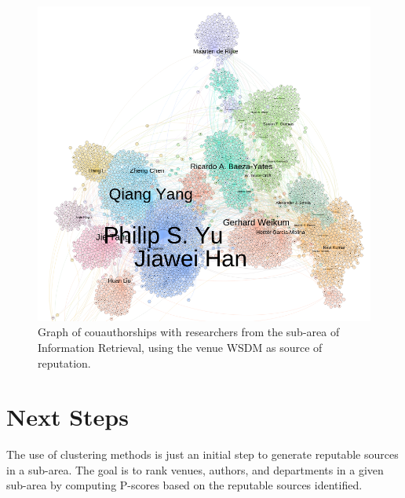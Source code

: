 \documentclass[msc]{ppgccufmg}
\begin{document}
\begin{appendices}
\begin{figure}[h]
    \centering
    \includegraphics[scale=0.45]{fig/wsdm}
    \caption{Graph of couauthorships with researchers from the sub-area of Information Retrieval, using the venue WSDM as source of reputation. }
    \label{fig:wsdm}
\end{figure}


% 

\section{Next Steps}

The use of clustering methods is just an initial step to generate reputable sources in a sub-area. The goal is to rank venues, authors, and departments in a given sub-area by computing P-scores based on the reputable sources identified.


\end{appendices}
\end{document}
